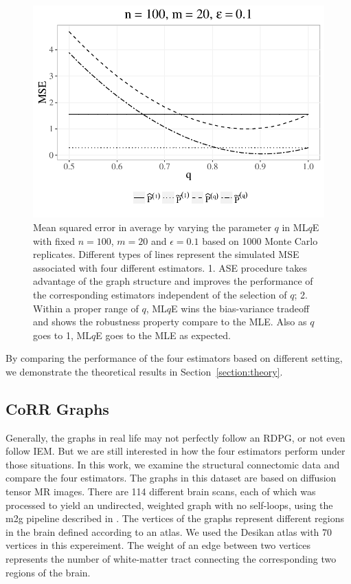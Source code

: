 \documentclass[a4paper]{article}
\begin{document}
\begin{figure}[!htb]
\centering
\includegraphics[width=1\textwidth]{sim_q.pdf}
\caption{Mean squared error in average by varying the parameter $q$ in ML$q$E with fixed $n = 100$, $m = 20$ and $\epsilon = 0.1$ based on 1000 Monte Carlo replicates. Different types of lines represent the simulated MSE associated with four different estimators.
1. ASE procedure takes advantage of the graph structure and improves the performance of the corresponding estimators independent of the selection of $q$;
2. Within a proper range of $q$, ML$q$E wins the bias-variance tradeoff and shows the robustness property compare to the MLE. Also as $q$ goes to 1, ML$q$E goes to the MLE as expected.}
\label{fig:q}
\end{figure}

By comparing the performance of the four estimators based on different setting, we demonstrate the theoretical results in Section~\ref{section:theory}.


\subsection{CoRR Graphs}
\label{section:real_data}

Generally, the graphs in real life may not perfectly follow an RDPG, or not even follow IEM. But we are still interested in how the four estimators perform under those situations. In this work, we examine the structural connectomic data and compare the four estimators. The graphs in this dataset are based on diffusion tensor MR
images. There are 114 different brain scans, each of which was processed to yield an undirected, weighted graph with no self-loops, using the m2g pipeline described in \citep{kiar2016ndmg}. The vertices of the graphs represent different regions in the brain defined according to an atlas. We used the Desikan atlas with 70 vertices in this expereiment. The weight of an edge between two vertices represents the number of white-matter tract connecting the corresponding two regions of the brain.
\end{document}
